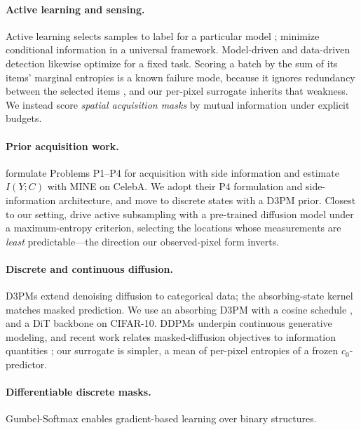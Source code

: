 \documentclass{article}
\begin{document}
\paragraph{Active learning and sensing.}
Active learning selects samples to label for a particular model \citep{guo2007active}; \citet{shayovitz2023universal} minimize conditional information in a universal framework. Model-driven \citep{kay1998detection} and data-driven \citep{han2021radar} detection likewise optimize for a fixed task. Scoring a batch by the sum of its items' marginal entropies is a known failure mode, because it ignores redundancy between the selected items \citep{kirsch2019batchbald}, and our per-pixel surrogate inherits that weakness. We instead score \emph{spatial acquisition masks} by mutual information under explicit budgets.

\paragraph{Prior acquisition work.}
\citet{vuong2025cnc} formulate Problems P1--P4 for acquisition with side information and estimate $I(Y;C)$ with MINE on CelebA. We adopt their P4 formulation and side-information architecture, and move to discrete states with a D3PM prior. Closest to our setting, \citet{nolan2025ads} drive active subsampling with a pre-trained diffusion model under a maximum-entropy criterion, selecting the locations whose measurements are \emph{least} predictable---the direction our observed-pixel form inverts.

\paragraph{Discrete and continuous diffusion.}
D3PMs \citep{austin2021structured} extend denoising diffusion to categorical data; the absorbing-state kernel matches masked prediction. We use an absorbing D3PM with a cosine schedule \citep{ryu2024d3pm}, and a DiT backbone \citep{peebles2023dit} on CIFAR-10. DDPMs \citep{ho2020ddpm} underpin continuous generative modeling, and recent work relates masked-diffusion objectives to information quantities \citep{nie2025lld}; our surrogate is simpler, a mean of per-pixel entropies of a frozen $c_0$-predictor.

\paragraph{Differentiable discrete masks.}
Gumbel-Softmax \citep{jang2017gumbel,maddison2017concrete} enables gradient-based learning over binary structures.
\end{document}
